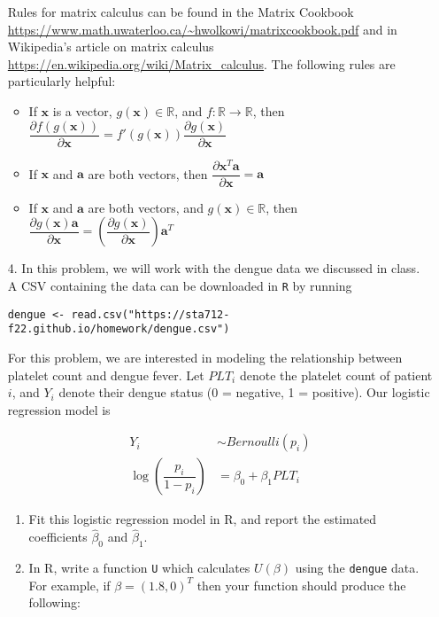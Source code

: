 \documentclass[11pt]{article}
\begin{document}
\begin{enumerate}
Rules for matrix calculus can be found in the Matrix Cookbook \url{https://www.math.uwaterloo.ca/~hwolkowi/matrixcookbook.pdf} and in Wikipedia's article on matrix calculus \url{https://en.wikipedia.org/wiki/Matrix_calculus}. The following rules are particularly helpful:
\begin{itemize}
\item If $\mathbf{x}$ is a vector, $g(\mathbf{x}) \in \mathbb{R}$, and $f: \mathbb{R} \to \mathbb{R}$, then $\dfrac{\partial f(g(\mathbf{x}))}{\partial \mathbf{x}} = f'(g(\mathbf{x})) \dfrac{\partial g(\mathbf{x})}{\partial \mathbf{x}}$
\item If $\mathbf{x}$ and $\mathbf{a}$ are both vectors, then $\dfrac{\partial \mathbf{x}^T \mathbf{a}}{\partial \mathbf{x}} = \mathbf{a}$
\item If $\mathbf{x}$ and $\mathbf{a}$ are both vectors, and $g(\mathbf{x}) \in \mathbb{R}$, then $\dfrac{\partial g(\mathbf{x}) \mathbf{a}}{\partial \mathbf{x}} = \left( \dfrac{\partial g(\mathbf{x})}{\partial \mathbf{x}} \right) \mathbf{a}^T$
\end{itemize}

\newpage

\item[4.] In this problem, we will work with the dengue data we discussed in class. A CSV containing the data can be downloaded in \texttt{R} by running
\begin{center}
\texttt{dengue <- read.csv("https://sta712-f22.github.io/homework/dengue.csv")}
\end{center}

For this problem, we are interested in modeling the relationship between platelet count and dengue fever. Let $PLT_i$ denote the platelet count of patient $i$, and $Y_i$ denote their dengue status (0 = negative, 1 = positive). Our logistic regression model is

\begin{align*}
Y_i &\sim Bernoulli(p_i)\\
\log \left( \dfrac{p_i}{1 - p_i} \right) &= \beta_0 + \beta_1 PLT_i
\end{align*}

\begin{enumerate}
\item Fit this logistic regression model in R, and report the estimated coefficients $\widehat{\beta}_0$ and $\widehat{\beta}_1$.
\item In R, write a function \texttt{U} which calculates $U(\beta)$ using the \texttt{dengue} data. For example, if $\beta = (1.8, 0)^T$ then your function should produce the following:


\end{enumerate}
\end{enumerate}
\end{document}
